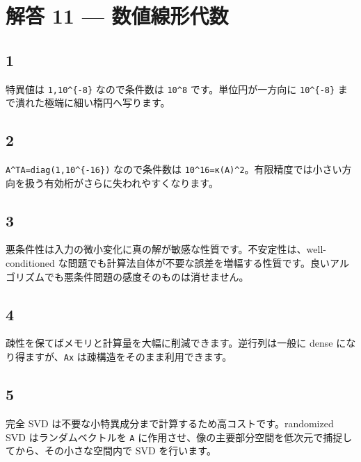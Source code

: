 \documentclass[
  11pt,
  a4paper,
]{ltjsarticle}
\author{}
\date{}
\begin{document}
\hypertarget{ux89e3ux7b54-11-ux6570ux5024ux7ddaux5f62ux4ee3ux6570}{%
\section{解答 11 ---
数値線形代数}\label{ux89e3ux7b54-11-ux6570ux5024ux7ddaux5f62ux4ee3ux6570}}

\hypertarget{section}{%
\subsection{1}\label{section}}

特異値は \texttt{1,10\^{}\{-8\}} なので条件数は \texttt{10\^{}8}
です。単位円が一方向に \texttt{10\^{}\{-8\}}
まで潰れた極端に細い楕円へ写ります。

\hypertarget{section-1}{%
\subsection{2}\label{section-1}}

\texttt{A\^{}TA=diag(1,10\^{}\{-16\})} なので条件数は
\texttt{10\^{}16=κ(A)\^{}2}。有限精度では小さい方向を扱う有効桁がさらに失われやすくなります。

\hypertarget{section-2}{%
\subsection{3}\label{section-2}}

悪条件性は入力の微小変化に真の解が敏感な性質です。不安定性は、well-conditioned
な問題でも計算法自体が不要な誤差を増幅する性質です。良いアルゴリズムでも悪条件問題の感度そのものは消せません。

\hypertarget{section-3}{%
\subsection{4}\label{section-3}}

疎性を保てばメモリと計算量を大幅に削減できます。逆行列は一般に dense
になり得ますが、\texttt{Ax} は疎構造をそのまま利用できます。

\hypertarget{section-4}{%
\subsection{5}\label{section-4}}

完全 SVD は不要な小特異成分まで計算するため高コストです。randomized SVD
はランダムベクトルを \texttt{A}
に作用させ、像の主要部分空間を低次元で捕捉してから、その小さな空間内で
SVD を行います。
\end{document}

